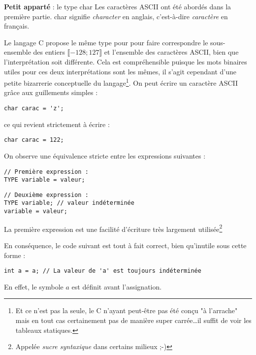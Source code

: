 \documentclass[../../../main.tex]{subfiles}
\begin{document}
\begin{minitelbasicbox}{\textbf{Petit apparté} : le type \textsf{char}}
Les caractères ASCII ont été abordés dans la première partie. \textsf{char} signifie \textit{character} en anglais, c'est-à-dire \textit{caractère} en français.

Le langage C propose le même type pour pour faire correspondre le sous-ensemble des entiers $\llbracket-128; 127\rrbracket$ et l'ensemble des caractères ASCII, bien que l'interprétation soit différente. Cela est compréhensible puisque les mots binaires utiles pour ces deux interprétations sont les mêmes, il s'agit cependant d'une petite bizarrerie conceptuelle du langage\footnote{Et ce n'est pas la seule, le C n'ayant peut-être pas été conçu "à l'arrache" mais en tout cas certainement pas de manière super carrée\dots il suffit de voir les tableaux statiques.}. On peut écrire un caractère ASCII grâce aux guillements simples :
\begin{verbatim}
char carac = 'z';
\end{verbatim}
ce qui revient strictement à écrire :
\begin{verbatim}
char carac = 122;
\end{verbatim}
\end{minitelbasicbox}

On observe une équivalence stricte entre les expressions suivantes : 

\begin{minipage}{0.5\textwidth}
\begin{verbatim}
// Première expression :
TYPE variable = valeur;

\end{verbatim}
\end{minipage}
\begin{minipage}{0.5\textwidth}
\begin{verbatim}
// Deuxième expression :
TYPE variable; // valeur indéterminée
variable = valeur;
\end{verbatim}
\end{minipage}

La première expression est une facilité d'écriture très largement utilisée\footnote{Appelée \textit{sucre syntaxique} dans certains milieux ;-)}
 
En conséquence, le code suivant est tout à fait correct, bien qu'inutile sous cette forme :
\begin{verbatim}
int a = a; // La valeur de 'a' est toujours indéterminée
\end{verbatim}
En effet, le symbole $a$ est définit avant l'assignation.
\end{document}
